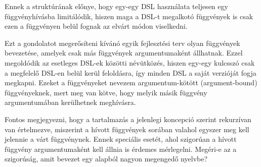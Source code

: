 Ennek a struktúrának előnye, hogy egy-egy \gls{DSL} használata teljesen egy függvényhívásba limitálódik, hiszen maga a \gls{DSL}-t megalkotó függvények is csak ezen a függvényen belül fognak az elvárt módon viselkedni.

Ezt a gondolatot megerősíteni kívánó egyik fejlesztési terv olyan függvények bevezetése, amelyek csak más függvények argumentumaként állhatnak.
Ezzel megoldódik az esetleges \gls{DSL}-ek közötti névütközés, hiszen egy-egy kulcsszó csak a megfelelő \gls{DSL}-en belül kerül feloldásra, így minden \gls{DSL} a saját verzióját fogja megkapni.
Ezeket a függvényeket nevezem argumentum-kötött (argument-bound) függvényeknek, mert meg van kötve, hogy melyik másik függvény argumentumában kerülhetnek meghívásra.

Fontos megjegyezni, hogy a tartalmazás a jelenlegi koncepció szerint rekurzívan van értelmezve, miszerint a hívott függvények sorában valahol egyszer meg kell jelennie a várt függvénynek.
Ennek speciális esetét, ahol szigorúan a hívott függvény argumentumaként kell állnia is érdemes mérlegelni. Megéri-e az a szigorúság, amit bevezet egy alapból nagyon megengedő nyelvbe?















